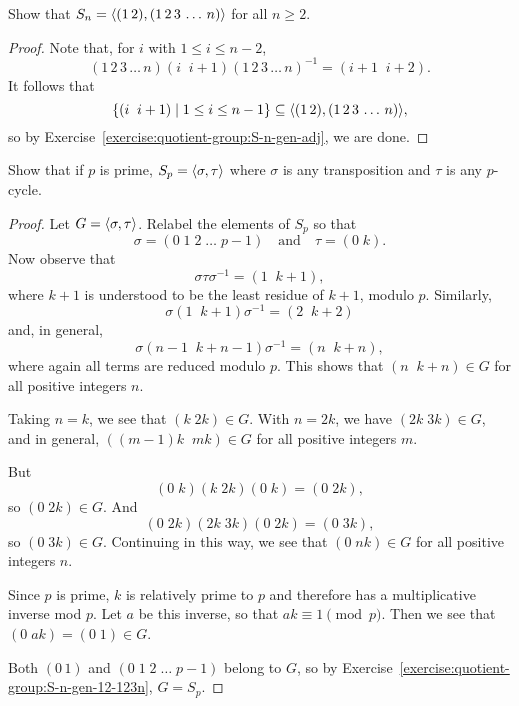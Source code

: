 \label{exercise:quotient-group:S-n-gen-12-123n}
Show that $S_n = \langle{(1\,2), (1\,2\,3\,\dots\,n)}\rangle$ for all $n\geq2$.
\begin{proof}
  Note that, for $i$ with $1\leq i\leq n-2$,
  \begin{equation*}
    (1\,2\,3\,\dots\,n)(i\;\;i+1)(1\,2\,3\,\dots\,n)^{-1}
    = (i+1\;\;i+2).
  \end{equation*}
  It follows that
  \begin{equation*}
    \{(i\;\;i+1)\mid1\leq i\leq n-1\}
    \subseteq \langle{(1\,2), (1\,2\,3\,\dots\,n)}\rangle,
  \end{equation*}
  so by Exercise~\ref{exercise:quotient-group:S-n-gen-adj}, we are
  done.
\end{proof}

 Show that if $p$ is prime, $S_p = \langle{\sigma,\tau}\rangle$ where
$\sigma$ is any transposition and $\tau$ is any $p$-cycle.
\begin{proof}
  Let $G = \langle{\sigma,\tau}\rangle$. Relabel the elements of $S_p$ so that
  \begin{equation*}
    \sigma = (0\;1\;2\;\dots\;p-1)
    \quad\text{and}\quad
    \tau = (0\;k).
  \end{equation*}
  Now observe that
  \begin{equation*}
    \sigma\tau\sigma^{-1} = (1\;\;k+1),
  \end{equation*}
  where $k+1$ is understood to be the least residue of $k+1$, modulo
  $p$. Similarly,
  \begin{equation*}
    \sigma(1\;\;k+1)\sigma^{-1} = (2\;\;k+2)
  \end{equation*}
  and, in general,
  \begin{equation*}
    \sigma(n-1\;\;k+n-1)\sigma^{-1} = (n\;\;k+n),
  \end{equation*}
  where again all terms are reduced modulo $p$. This shows that
  $(n\;\;k+n)\in G$ for all positive integers $n$.

  Taking $n = k$, we see that $(k\;2k)\in G$. With $n = 2k$, we have
  $(2k\;3k)\in G$, and in general, $((m-1)k\;\;mk)\in G$ for all
  positive integers $m$.

  But
  \begin{equation*}
    (0\;k)(k\;2k)(0\;k) = (0\;2k),
  \end{equation*}
  so $(0\;2k)\in G$. And
  \begin{equation*}
    (0\;2k)(2k\;3k)(0\;2k) = (0\;3k),
  \end{equation*}
  so $(0\;3k)\in G$. Continuing in this way, we see that
  $(0\;nk)\in G$ for all positive integers $n$.

  Since $p$ is prime, $k$ is relatively prime to $p$ and therefore has
  a multiplicative inverse mod $p$. Let $a$ be this inverse, so that
  $ak\equiv1\pmod{p}$. Then we see that $(0\;ak) = (0\;1)\in G$.

  Both $(0\,1)$ and $(0\;1\;2\;\dots\;p-1)$ belong to $G$, so by
  Exercise~\ref{exercise:quotient-group:S-n-gen-12-123n}, $G = S_p$.
\end{proof}

